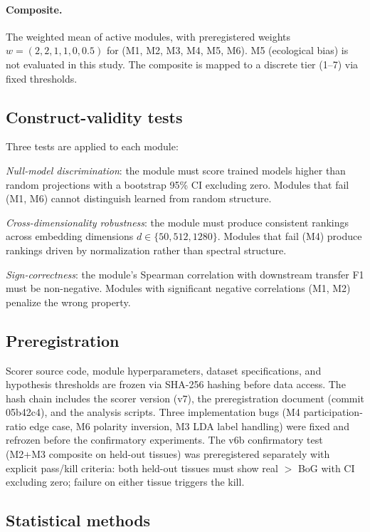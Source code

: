\documentclass[9pt,lineno]{elife}
\begin{document}
\paragraph{Composite.} The weighted mean of active modules, with preregistered weights $w = (2, 2, 1, 1, 0, 0.5)$ for (M1, M2, M3, M4, M5, M6). M5 (ecological bias) is not evaluated in this study. The composite is mapped to a discrete tier (1--7) via fixed thresholds.

\subsection{Construct-validity tests}

Three tests are applied to each module:

\emph{Null-model discrimination}: the module must score trained models higher than random projections with a bootstrap 95\% CI excluding zero. Modules that fail (M1, M6) cannot distinguish learned from random structure.

\emph{Cross-dimensionality robustness}: the module must produce consistent rankings across embedding dimensions $d \in \{50, 512, 1280\}$. Modules that fail (M4) produce rankings driven by normalization rather than spectral structure.

\emph{Sign-correctness}: the module's Spearman correlation with downstream transfer F1 must be non-negative. Modules with significant negative correlations (M1, M2) penalize the wrong property.

\subsection{Preregistration}

Scorer source code, module hyperparameters, dataset specifications, and hypothesis thresholds are frozen via SHA-256 hashing before data access. The hash chain includes the scorer version (v7), the preregistration document (commit 05b42c4), and the analysis scripts. Three implementation bugs (M4 participation-ratio edge case, M6 polarity inversion, M3 LDA label handling) were fixed and refrozen before the confirmatory experiments. The v6b confirmatory test (M2+M3 composite on held-out tissues) was preregistered separately with explicit pass/kill criteria: both held-out tissues must show real $>$ BoG with CI excluding zero; failure on either tissue triggers the kill.

\subsection{Statistical methods}
\end{document}
